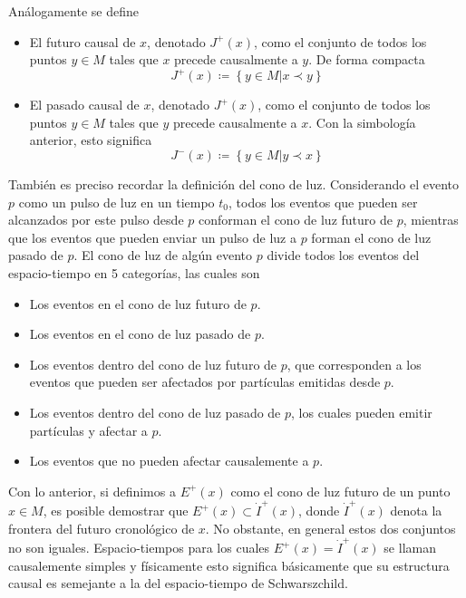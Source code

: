 \documentclass[16pt,a4paper]{article}
\numberwithin{equation}{section}
\theoremstyle{definition}
\begin{document}
Análogamente se define
\begin{itemize}
	\item El futuro causal de $x$, denotado $J^+(x)$, como el conjunto de todos los puntos $y \in M$ tales que $x$ precede causalmente a $y$. De forma compacta
	\begin{equation*}
	J^+(x) \coloneqq \left\lbrace y \in M | x \prec y \right\rbrace
	\end{equation*}
	\item El pasado causal de $x$, denotado $J^+(x)$, como el conjunto de todos los puntos $y \in M$ tales que $y$ precede causalmente a $x$. Con la simbología anterior, esto significa
	\begin{equation*}
	J^-(x) \coloneqq \left\lbrace y \in M | y \prec x \right\rbrace
	\end{equation*}
\end{itemize}

También es preciso recordar la definición del cono de luz. Considerando el evento $p$ como un pulso de luz en un tiempo $t_0$, todos los eventos que pueden ser alcanzados por este pulso desde $p$ conforman el cono de luz futuro de $p$, mientras que los eventos que pueden enviar un pulso de luz a $p$ forman el cono de luz pasado de $p$. El cono de luz de algún evento $p$ divide todos los eventos del espacio-tiempo en 5 categorías, las cuales son
\begin{itemize}
	\item Los eventos en el cono de luz futuro de $p$.
	
	\item Los eventos en el cono de luz pasado de $p$.
	
	\item Los eventos dentro del cono de luz futuro de $p$, que corresponden a los eventos que pueden ser afectados por partículas emitidas desde $p$.
	
	\item Los eventos dentro del cono de luz pasado de $p$, los cuales pueden emitir partículas y afectar a $p$.
	
	\item Los eventos que no pueden afectar causalemente a $p$.
\end{itemize}

Con lo anterior, si definimos a $E^+(x)$ como el cono de luz futuro de un punto $x \in M$, es posible demostrar que $E^+(x) \subset \dot{I}^+(x)$, donde $\dot{I}^+(x)$ denota la frontera del futuro cronológico de $x$. No obstante, en general estos dos conjuntos no son iguales. Espacio-tiempos para los cuales $E^+(x) = \dot{I}^+(x)$ se llaman causalemente simples y físicamente esto significa básicamente que su estructura causal es semejante a la del espacio-tiempo de Schwarszchild.\\
\end{document}
